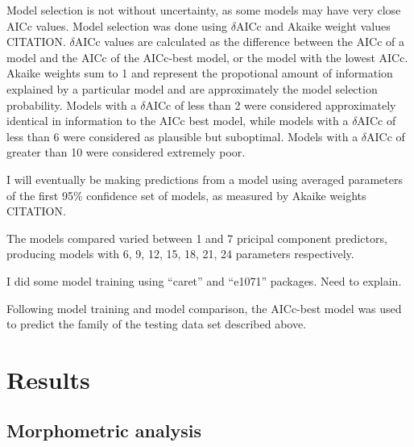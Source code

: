 \documentclass{article}\usepackage{graphicx, color}
\begin{document}
Model selection is not without uncertainty, as some models may have very close AICc values. Model selection was done using \(\delta\)AICc and Akaike weight values CITATION. \(\delta\)AICc values are calculated as the difference between the AICc of a model and the AICc of the AICc-best model, or the model with the lowest AICc. Akaike weights sum to 1 and represent the propotional amount of information explained by a particular model and are approximately the model selection probability. Models with a \(\delta\)AICc of less than 2 were considered approximately identical in information to the AICc best model, while models with a \(\delta\)AICc of less than 6 were considered as plausible but suboptimal. Models with a \(\delta\)AICc of greater than 10 were considered extremely poor.

I will eventually be making predictions from a model using averaged parameters of the first 95\% confidence set of models, as measured by Akaike weights CITATION.

The models compared varied between 1 and 7 pricipal component predictors, producing models with 6, 9, 12, 15, 18, 21, 24 parameters respectively. 

I did some model training using ``caret'' and ``e1071'' packages. Need to explain.

Following model training and model comparison, the AICc-best model was used to predict the family of the testing data set described above.

\section{Results}

\subsection{Morphometric analysis}
\end{document}
